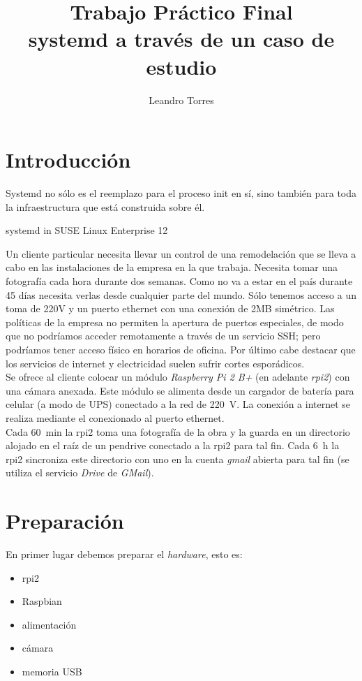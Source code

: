 \documentclass[10pt,a4paper]{article}
\author{Leandro Torres}
\title{\Huge{Trabajo Pr\'actico Final}\\
	\vspace{5cm}
	\huge{systemd a trav\'es de un caso de estudio}}
\begin{document}
\maketitle
\pagebreak
\tableofcontents

\section{Introducci\'on}

\epigraph{Systemd no s\'olo es el reemplazo para el proceso init en s\'i, sino tambi\'en para toda la infraestructura que est\'a construida sobre \'el.}{systemd in SUSE Linux Enterprise 12}

Un cliente particular necesita llevar un control de una remodelaci\'on que se lleva a cabo en las instalaciones de la empresa en la que trabaja. Necesita tomar una fotograf\'ia cada hora durante dos semanas. Como no va a estar en el pa\'is durante 45 d\'ias necesita verlas desde cualquier parte del mundo. S\'olo tenemos acceso a un toma de 220V y un puerto ethernet con una conexi\'on de 2MB sim\'etrico. Las pol\'iticas de la empresa no permiten la apertura de puertos especiales, de modo que no podr\'iamos acceder remotamente a trav\'es de un servicio SSH; pero podr\'iamos tener acceso f\'isico en horarios de oficina. Por \'ultimo cabe destacar que los servicios de internet y electricidad suelen sufrir cortes espor\'adicos.\\

Se ofrece al cliente colocar un m\'odulo \emph{Raspberry Pi 2 B+} (en adelante \emph{rpi2}) con una c\'amara anexada. Este m\'odulo se alimenta desde un cargador de bater\'ia para celular (a modo de UPS) conectado a la red de \SI{220}{V}. La conexi\'on a internet se realiza mediante el conexionado al puerto ethernet.\\

Cada \SI{60}{min} la rpi2 toma una fotograf\'ia de la obra y la guarda en un directorio alojado en el ra\'iz de un pendrive conectado a la rpi2 para tal fin. Cada \SI{6}{h} la rpi2 sincroniza este directorio con uno en la cuenta \emph{gmail} abierta para tal fin (se utiliza el servicio \emph{Drive} de \emph{GMail}).

\section{Preparaci\'on}

En primer lugar debemos preparar el \emph{hardware}, esto es:
\begin{itemize}
    \item rpi2
    \item Raspbian
    \item alimentaci\'on
    \item c\'amara
    \item memoria USB
\end{itemize}
\end{document}
